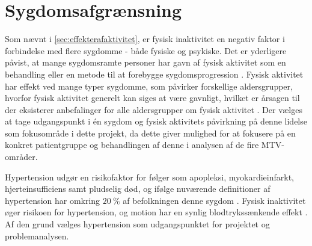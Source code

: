 \section{Sygdomsafgrænsning}
Som nævnt i \autoref{sec:effekterafaktivitet}, er fysisk inaktivitet en negativ faktor i forbindelse med flere sygdomme - både fysiske og psykiske. Det er yderligere påvist, at mange sygdomsramte personer har gavn af fysisk aktivitet som en behandling eller en metode til at forebygge sygdomsprogression \cite{motionsraad2007,pedersen2011}. Fysisk aktivitet har effekt ved mange typer sygdomme, som påvirker forskellige aldersgrupper, hvorfor fysisk aktivitet generelt kan siges at være gavnligt, hvilket er årsagen til der eksisterer anbefalinger for alle aldersgrupper om fysisk aktivitet \cite{pedersen2011}. Der vælges at tage udgangspunkt i én sygdom og fysisk aktivitets påvirkning på denne lidelse som fokusområde i dette projekt, da dette giver mulighed for at fokusere på en konkret patientgruppe og behandlingen af denne i analysen af de fire MTV-områder.

Hypertension udgør en risikofaktor for følger som apopleksi, myokardieinfarkt, hjerteinsufficiens samt pludselig død, og ifølge nuværende definitioner af hypertension har omkring $20~\%$ af befolkningen denne sygdom \cite{pedersen2011}. Fysisk inaktivitet øger risikoen for hypertension, og motion har en synlig blodtrykssænkende effekt \cite{olsen2015}. Af den grund vælges hypertension som udgangspunktet for projektet og problemanalysen. 